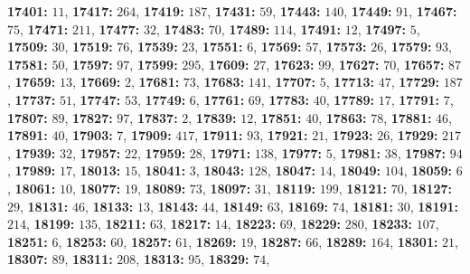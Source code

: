 \textsf{\bfseries 17401:} $11$, \textsf{\bfseries 17417:} $264$, \textsf{\bfseries 17419:} $187$, \textsf{\bfseries 17431:} $59$, \textsf{\bfseries 17443:} $140$, \textsf{\bfseries 17449:} $91$, \textsf{\bfseries 17467:} $75$, \textsf{\bfseries 17471:} $211$, \textsf{\bfseries 17477:} $32$, \textsf{\bfseries 17483:} $70$, \textsf{\bfseries 17489:} $114$, \textsf{\bfseries 17491:} $12$, \textsf{\bfseries 17497:} $5$, \textsf{\bfseries 17509:} $30$, \textsf{\bfseries 17519:} $76$, \textsf{\bfseries 17539:} $23$, \textsf{\bfseries 17551:} $6$, \textsf{\bfseries 17569:} $57$, \textsf{\bfseries 17573:} $26$, \textsf{\bfseries 17579:} $93$, \textsf{\bfseries 17581:} $50$, \textsf{\bfseries 17597:} $97$, \textsf{\bfseries 17599:} $295$, \textsf{\bfseries 17609:} $27$, \textsf{\bfseries 17623:} $99$, \textsf{\bfseries 17627:} $70$, \textsf{\bfseries 17657:} $87$, \textsf{\bfseries 17659:} $13$, \textsf{\bfseries 17669:} $2$, \textsf{\bfseries 17681:} $73$, \textsf{\bfseries 17683:} $141$, \textsf{\bfseries 17707:} $5$, \textsf{\bfseries 17713:} $47$, \textsf{\bfseries 17729:} $187$, \textsf{\bfseries 17737:} $51$, \textsf{\bfseries 17747:} $53$, \textsf{\bfseries 17749:} $6$, \textsf{\bfseries 17761:} $69$, \textsf{\bfseries 17783:} $40$, \textsf{\bfseries 17789:} $17$, \textsf{\bfseries 17791:} $7$, \textsf{\bfseries 17807:} $89$, \textsf{\bfseries 17827:} $97$, \textsf{\bfseries 17837:} $2$, \textsf{\bfseries 17839:} $12$, \textsf{\bfseries 17851:} $40$, \textsf{\bfseries 17863:} $78$, \textsf{\bfseries 17881:} $46$, \textsf{\bfseries 17891:} $40$, \textsf{\bfseries 17903:} $7$, \textsf{\bfseries 17909:} $417$, \textsf{\bfseries 17911:} $93$, \textsf{\bfseries 17921:} $21$, \textsf{\bfseries 17923:} $26$, \textsf{\bfseries 17929:} $217$, \textsf{\bfseries 17939:} $32$, \textsf{\bfseries 17957:} $22$, \textsf{\bfseries 17959:} $28$, \textsf{\bfseries 17971:} $138$, \textsf{\bfseries 17977:} $5$, \textsf{\bfseries 17981:} $38$, \textsf{\bfseries 17987:} $94$, \textsf{\bfseries 17989:} $17$, \textsf{\bfseries 18013:} $15$, \textsf{\bfseries 18041:} $3$, \textsf{\bfseries 18043:} $128$, \textsf{\bfseries 18047:} $14$, \textsf{\bfseries 18049:} $104$, \textsf{\bfseries 18059:} $6$, \textsf{\bfseries 18061:} $10$, \textsf{\bfseries 18077:} $19$, \textsf{\bfseries 18089:} $73$, \textsf{\bfseries 18097:} $31$, \textsf{\bfseries 18119:} $199$, \textsf{\bfseries 18121:} $70$, \textsf{\bfseries 18127:} $29$, \textsf{\bfseries 18131:} $46$, \textsf{\bfseries 18133:} $13$, \textsf{\bfseries 18143:} $44$, \textsf{\bfseries 18149:} $63$, \textsf{\bfseries 18169:} $74$, \textsf{\bfseries 18181:} $30$, \textsf{\bfseries 18191:} $214$, \textsf{\bfseries 18199:} $135$, \textsf{\bfseries 18211:} $63$, \textsf{\bfseries 18217:} $14$, \textsf{\bfseries 18223:} $69$, \textsf{\bfseries 18229:} $280$, \textsf{\bfseries 18233:} $107$, \textsf{\bfseries 18251:} $6$, \textsf{\bfseries 18253:} $60$, \textsf{\bfseries 18257:} $61$, \textsf{\bfseries 18269:} $19$, \textsf{\bfseries 18287:} $66$, \textsf{\bfseries 18289:} $164$, \textsf{\bfseries 18301:} $21$, \textsf{\bfseries 18307:} $89$, \textsf{\bfseries 18311:} $208$, \textsf{\bfseries 18313:} $95$, \textsf{\bfseries 18329:} $74$, 
